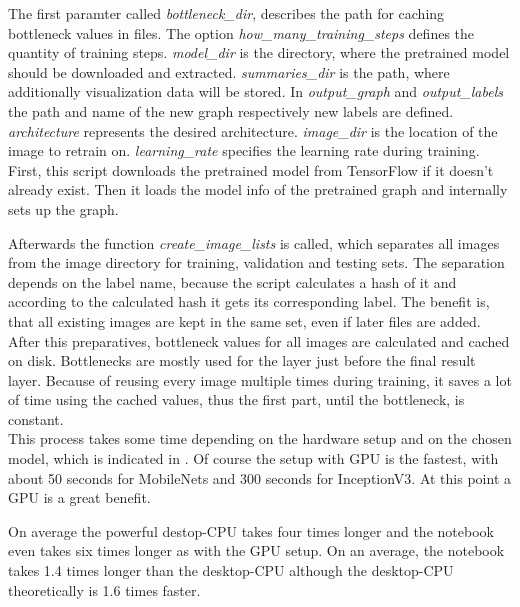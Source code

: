 The first paramter called \textit{bottleneck_dir}, describes the path for caching bottleneck values in files. The option \textit{how_many_training_steps} defines the quantity of training steps. \textit{model_dir} is the directory, where the pretrained model should be downloaded and extracted. \textit{summaries_dir} is the path, where additionally visualization data will be stored. In \textit{output_graph} and \textit{output_labels} the path and name of the new graph respectively new labels are defined. \textit{architecture} represents the desired architecture. \textit{image_dir} is the location of the image to retrain on. \textit{learning_rate} specifies the learning rate during training. \\


First, this script downloads the pretrained model from TensorFlow if it doesn't already exist. Then it loads the model info of the pretrained graph and internally sets up the graph.

Afterwards the function \textit{create_image_lists} is called, which separates all images from the image directory for training, validation and testing sets. The separation depends on the label name, because the script calculates a hash of it and according to the calculated hash it gets its corresponding label. The benefit is, that all existing images are kept in the same set, even if later files are added. \\

After this preparatives, bottleneck values for all images are calculated and cached on disk. Bottlenecks are mostly used for the layer just before the final result layer. Because of reusing every image multiple times during training, it saves a lot of time using the cached values, thus the first part, until the bottleneck, is constant.  \citep{TensorFlowRetrain2017} \\

This process takes some time depending on the hardware setup and on the chosen model, which is indicated in . Of course the setup with GPU is the fastest, with about 50 seconds for MobileNets and 300 seconds for InceptionV3. At this point a GPU is a great benefit. 

On average the powerful destop-CPU takes four times longer and the notebook even takes six times longer as with the GPU setup. On an average, the notebook takes 1.4 times longer than the desktop-CPU although the desktop-CPU theoretically is 1.6 times faster. \\

